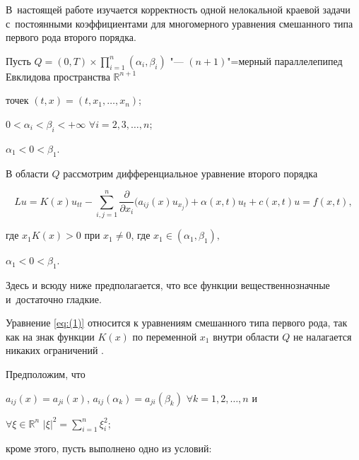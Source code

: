 В~настоящей работе изучается корректность одной нелокальной краевой задачи с~постоянными коэффициентами для многомерного уравнения смешанного типа первого рода второго порядка.



Пусть $Q=(0,T)\times \prod _{i=1}^{n}{({{\alpha }_{i}},{{\beta }_{i}})}$ "--- $(n+1)$"=мерный параллелепипед Евклидова пространства $\mathbb R^{n+1}$   

точек $ (t,x) =(t, x_1, \dots, x_n)$; 

$0<\alpha _i<{{\beta }_{i}}<+\infty $ $ \forall i=2, 3, \dots, n$;

$\alpha_1<0<\beta_1.$

В области $Q$ рассмотрим дифференциальное уравнение второго порядка

\begin{equation}

\label{eq:(1)}

Lu=K(x) u_{tt}-

\sum\limits_{i,j=1}^{n} 

\frac{\partial }{\partial x_i} \bigl( a_{ij}(x) {u}_{x_j} \bigr)+\alpha (x,t) u_t+ c(x,t) u= f(x,t),

\end{equation}

где $x_{1} K(x)>0$ при ${x_1}\ne 0$, где ${x_1}\in (\alpha _1, \beta _1),$ 

$\alpha _1<0<\beta _1.$

Здесь и всюду ниже предполагается, что все функции вещественнозначные и~достаточно гладкие.



Уравнение \eqref{eq:(1)} относится к уравнениям смешанного типа первого рода, так как на знак функции $K(x)$ по переменной ${x_1}$ внутри области $Q$ не налагается никаких ограничений \cite{dzhamalov:6, dzhamalov:2}.



Предположим, что 

$a_{ij}(x)=a_{ji}(x)$, $a_{ij}(\alpha_k)= a_{ji}(\beta_k)$ $\forall k=1,2, \dots,n$ и  

$\forall {\xi \in \mathbb{R}^{n}}$ $ | \xi  |^2 =\sum_{i=1}^{n}\xi _{i}^{2}$;

кроме этого, пусть выполнено одно из условий:

